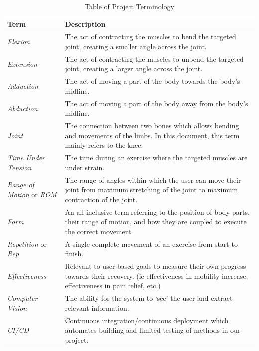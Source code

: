 \documentclass[12pt]{article}
\begin{document}
\begin{table}[H]
\centering
\begin{tabular}{|l m{10cm}|}
  \hline
  \textbf{Term} & \textbf{Description} \\
  \hline \hline
  \textit{Flexion} & The act of contracting the muscles to bend the targeted joint, creating a smaller angle across the joint. \\ \hline
  \textit{Extension} & The act of contracting the muscles to unbend the targeted joint, creating a larger angle across the joint. \\ \hline
  \textit{Adduction} & The act of moving a part of the body towards the body’s midline. \\ \hline
  \textit{Abduction} & The act of moving a part of the body away from the body’s midline. \\ \hline
  \textit{Joint} & The connection between two bones which allows bending and movements of the limbs. In this document, this term mainly refers to the knee. \\ \hline
  \textit{Time Under Tension} & The time during an exercise where the targeted muscles are under strain. \\ \hline
  \textit{Range of Motion} or \textit{ROM} & The range of angles within which the user can move their joint from maximum stretching of the joint to maximum contraction of the joint. \\ \hline
  \textit{Form} & An all inclusive term referring to the position of body parts, their range of motion, and how they are coupled to execute the correct movement. \\ \hline
  \textit{Repetition} or \textit{Rep} & A single complete movement of an exercise from start to finish. \\ \hline
  \textit{Effectiveness} & Relevant to user-based goals to measure their own progress towards their recovery. (ie effectiveness in mobility increase, effectiveness in pain relief, etc.) \\ \hline
  \textit{Computer Vision} & The ability for the system to ‘see’ the user and extract relevant information. \\ \hline
  \textit{CI/CD} & Continuous integration/continuous deployment which automates building and limited testing of methods in our project. \\ \hline
\end{tabular}
\caption{Table of Project Terminology}
\end{table}
\end{document}
